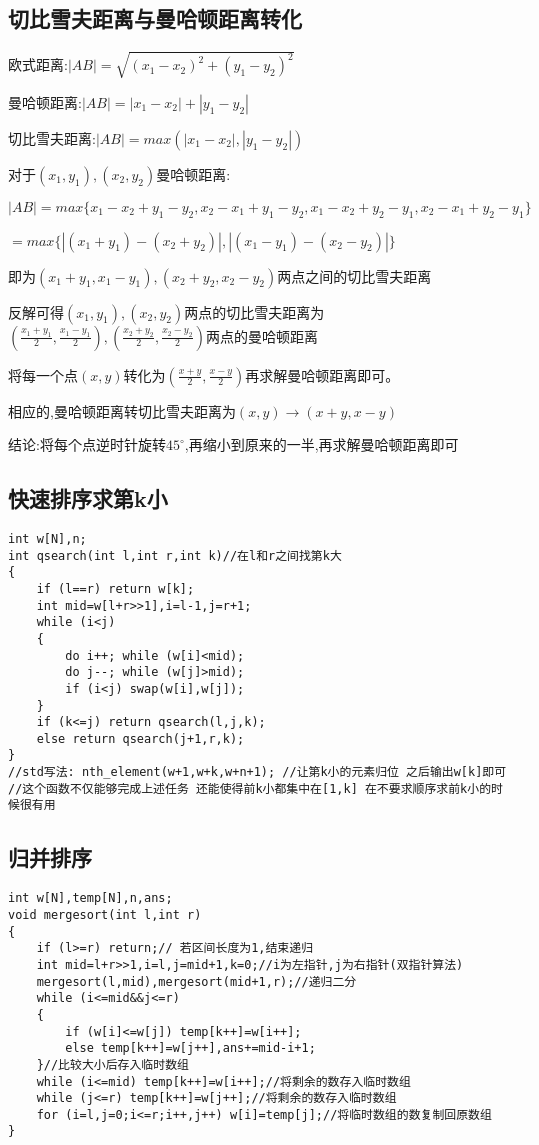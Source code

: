 \documentclass[a4paper]{ctexart}
\begin{document}
\subsection{切比雪夫距离与曼哈顿距离转化}

欧式距离:$|AB|=\sqrt{(x_1-x_2)^2+(y_1-y_2)^2}$

曼哈顿距离:$|AB|=|x_1-x_2|+|y_1-y_2|$

切比雪夫距离:$|AB|=max(|x_1-x_2|,|y_1-y_2|)$

对于$(x_1,y_1),(x_2,y_2)$曼哈顿距离:

$|AB|=max\{x_1-x_2+y_1-y_2,x_2-x_1+y_1-y_2,x_1-x_2+y_2-y_1,x_2-x_1+y_2-y_1\}$

$=max\{|(x_1+y_1)-(x_2+y_2)|,|(x_1-y_1)-(x_2-y_2)|\}$

即为$(x_1+y_1,x_1-y_1),(x_2+y_2,x_2-y_2)$两点之间的切比雪夫距离

反解可得$(x_1,y_1),(x_2,y_2)$两点的切比雪夫距离为$(\frac{x_1+y_1}{2},\frac{x_1-y_1}{2}),(\frac{x_2+y_2}{2},\frac{x_2-y_2}{2})$两点的曼哈顿距离

将每一个点$(x,y)$转化为$(\frac{x+y}{2},\frac{x-y}{2})$再求解曼哈顿距离即可。

相应的,曼哈顿距离转切比雪夫距离为$(x,y)\rightarrow (x+y,x-y)$

结论:将每个点逆时针旋转$45^\circ$,再缩小到原来的一半,再求解曼哈顿距离即可

\subsection{快速排序求第k小}

\begin{lstlisting}
int w[N],n;
int qsearch(int l,int r,int k)//在l和r之间找第k大
{
    if (l==r) return w[k];
    int mid=w[l+r>>1],i=l-1,j=r+1;
    while (i<j)
    {
        do i++; while (w[i]<mid);
        do j--; while (w[j]>mid);
        if (i<j) swap(w[i],w[j]);
    }
    if (k<=j) return qsearch(l,j,k);
    else return qsearch(j+1,r,k);
}
//std写法: nth_element(w+1,w+k,w+n+1); //让第k小的元素归位 之后输出w[k]即可
//这个函数不仅能够完成上述任务 还能使得前k小都集中在[1,k] 在不要求顺序求前k小的时候很有用
\end{lstlisting}

\subsection{归并排序}

\begin{lstlisting}
int w[N],temp[N],n,ans;
void mergesort(int l,int r)
{
    if (l>=r) return;// 若区间长度为1,结束递归 
    int mid=l+r>>1,i=l,j=mid+1,k=0;//i为左指针,j为右指针(双指针算法)
    mergesort(l,mid),mergesort(mid+1,r);//递归二分 
    while (i<=mid&&j<=r)
    {
        if (w[i]<=w[j]) temp[k++]=w[i++];
        else temp[k++]=w[j++],ans+=mid-i+1;
    }//比较大小后存入临时数组 
    while (i<=mid) temp[k++]=w[i++];//将剩余的数存入临时数组 
    while (j<=r) temp[k++]=w[j++];//将剩余的数存入临时数组 
    for (i=l,j=0;i<=r;i++,j++) w[i]=temp[j];//将临时数组的数复制回原数组 
}
\end{lstlisting}
\end{document}

